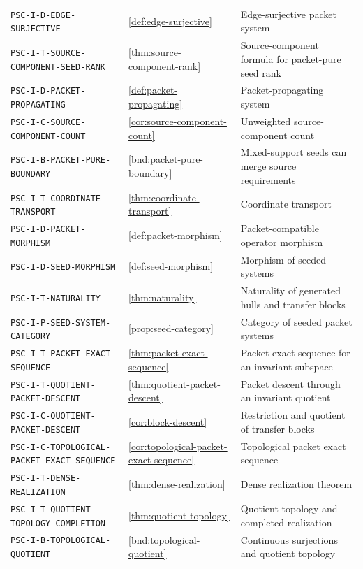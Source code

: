 \documentclass[11pt]{article}
\theoremstyle{definition}
\theoremstyle{remark}
\theoremstyle{definition}\newtheorem{example}[theorem]{Example}
\begin{document}
\begin{longtable}{@{}p{}p{}p{}@{}}
\nolinkurl{PSC-I-D-EDGE-SURJECTIVE} & \ref{def:edge-surjective} & Edge-surjective packet system \\
\nolinkurl{PSC-I-T-SOURCE-COMPONENT-SEED-RANK} & \ref{thm:source-component-rank} & Source-component formula for packet-pure seed rank \\
\nolinkurl{PSC-I-D-PACKET-PROPAGATING} & \ref{def:packet-propagating} & Packet-propagating system \\
\nolinkurl{PSC-I-C-SOURCE-COMPONENT-COUNT} & \ref{cor:source-component-count} & Unweighted source-component count \\
\nolinkurl{PSC-I-B-PACKET-PURE-BOUNDARY} & \ref{bnd:packet-pure-boundary} & Mixed-support seeds can merge source requirements \\
\nolinkurl{PSC-I-T-COORDINATE-TRANSPORT} & \ref{thm:coordinate-transport} & Coordinate transport \\
\nolinkurl{PSC-I-D-PACKET-MORPHISM} & \ref{def:packet-morphism} & Packet-compatible operator morphism \\
\nolinkurl{PSC-I-D-SEED-MORPHISM} & \ref{def:seed-morphism} & Morphism of seeded systems \\
\nolinkurl{PSC-I-T-NATURALITY} & \ref{thm:naturality} & Naturality of generated hulls and transfer blocks \\
\nolinkurl{PSC-I-P-SEED-SYSTEM-CATEGORY} & \ref{prop:seed-category} & Category of seeded packet systems \\
\nolinkurl{PSC-I-T-PACKET-EXACT-SEQUENCE} & \ref{thm:packet-exact-sequence} & Packet exact sequence for an invariant subspace \\
\nolinkurl{PSC-I-T-QUOTIENT-PACKET-DESCENT} & \ref{thm:quotient-packet-descent} & Packet descent through an invariant quotient \\
\nolinkurl{PSC-I-C-QUOTIENT-PACKET-DESCENT} & \ref{cor:block-descent} & Restriction and quotient of transfer blocks \\
\nolinkurl{PSC-I-C-TOPOLOGICAL-PACKET-EXACT-SEQUENCE} & \ref{cor:topological-packet-exact-sequence} & Topological packet exact sequence \\
\nolinkurl{PSC-I-T-DENSE-REALIZATION} & \ref{thm:dense-realization} & Dense realization theorem \\
\nolinkurl{PSC-I-T-QUOTIENT-TOPOLOGY-COMPLETION} & \ref{thm:quotient-topology} & Quotient topology and completed realization \\
\nolinkurl{PSC-I-B-TOPOLOGICAL-QUOTIENT} & \ref{bnd:topological-quotient} & Continuous surjections and quotient topology \\

\end{longtable}
\end{document}
